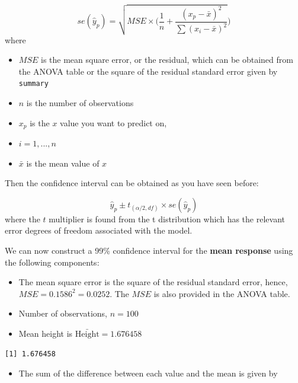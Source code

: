 \documentclass[
  oneside]{krantz}
\newenvironment{Shaded}{\begin{snugshade}}{\end{snugshade}}
\newcommand{\FunctionTok}[1]{\textcolor[rgb]{0.00,0.00,0.00}{#1}}
\newcommand{\NormalTok}[1]{#1}
\newcommand{\SpecialCharTok}[1]{\textcolor[rgb]{0.00,0.00,0.00}{#1}}
\providecommand{\tightlist}{%
  \setlength{\itemsep}{0pt}\setlength{\parskip}{0pt}}
\begin{document}
\[se(\hat{y}_p)=\sqrt{MSE\times (\frac{1}{n}+\frac{(x_p-\bar{x})^2}{\sum{(x_i-\bar{x})^2}}})\]
where

\begin{itemize}
\tightlist
\item
  \(MSE\) is the mean square error, or the residual, which can be obtained from the ANOVA table or the square of the residual standard error given by \texttt{summary}
\item
  \(n\) is the number of observations
\item
  \(x_p\) is the \(x\) value you want to predict on,
\item
  \(i = 1, ..., n\)
\item
  \(\bar x\) is the mean value of \(x\)
\end{itemize}

Then the confidence interval can be obtained as you have seen before:

\[\hat y_p \pm t_{(\alpha/2, df)}\times se(\hat{y}_p)\]
where the \(t\) multiplier is found from the t distribution which has the relevant error degrees of freedom associated with the model.

We can now construct a 99\% confidence interval for the \textbf{mean response} using the following components:

\begin{itemize}
\item
  The mean square error is the square of the residual standard error, hence, \(MSE = 0.1586^2 = 0.0252\). The \(MSE\) is also provided in the ANOVA table.
\item
  Number of observations, \(n=100\)
\item
  Mean height is \(\bar{\mathrm{Height}}=1.676458\)
\end{itemize}

\begin{Shaded}
\end{Shaded}

\begin{verbatim}
[1] 1.676458
\end{verbatim}

\begin{itemize}
\tightlist
\item
  The sum of the difference between each value and the mean is given by
\end{itemize}
\end{document}
